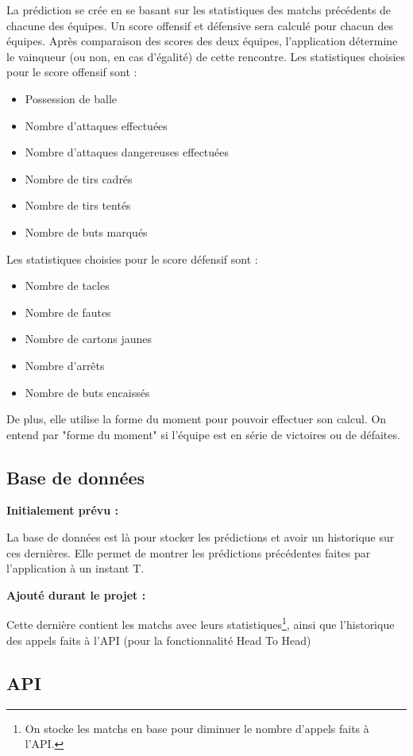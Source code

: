 \documentclass[a4paper,14pt]{extarticle}
\begin{document}
{La prédiction se crée en se basant sur les statistiques des matchs précédents de chacune des équipes. Un score offensif et défensive sera calculé pour chacun des équipes. Après comparaison des scores des deux équipes, l'application détermine le vainqueur (ou non, en cas d'égalité) de cette rencontre. 
 Les statistiques choisies pour le score offensif sont : 
\begin{itemize}
    \item Possession de balle
    \item Nombre d'attaques effectuées
    \item Nombre d'attaques dangereuses effectuées
    \item Nombre de tirs cadrés
    \item Nombre de tirs tentés
    \item Nombre de buts marqués
\end{itemize}

Les statistiques choisies pour le score défensif sont : 
\begin{itemize}
    \item Nombre de tacles
    \item Nombre de fautes
    \item Nombre de cartons jaunes
    \item Nombre d'arrêts
    \item Nombre de buts encaissés
\end{itemize}
De plus, elle utilise la forme du moment pour pouvoir effectuer son calcul. On entend par "forme du moment" si l'équipe est en série de victoires ou de défaites.
\subsection{Base de données}
\textbf{Initialement prévu :}

La base de données est là pour stocker les prédictions et avoir un historique sur ces dernières. Elle permet de montrer les prédictions précédentes faites par l'application à un instant T.

\textbf{Ajouté durant le projet :}

Cette dernière contient les matchs avec leurs statistiques\footnote{On stocke les matchs en base pour diminuer le nombre d'appels faits à l'API.}, ainsi que l'historique des appels faits à l'API (pour la fonctionnalité Head To Head)

\newpage

\subsection{API}

}
\end{document}
